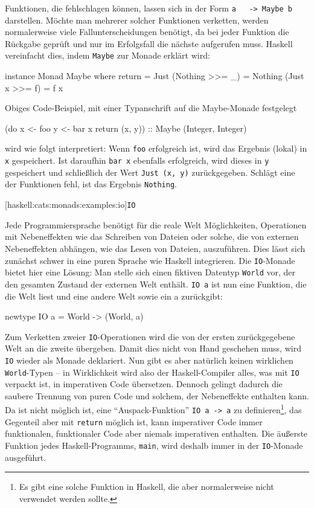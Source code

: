 \documentclass[12pt, a4paper, bibgerm]{scrbook}
\newenvironment{DIFnomarkup}{}{}
\newcommand\icode[1]{\lstinline?#1?}
\newcommand\lparagraph{}
\begin{document}
Funktionen, die fehlschlagen können, lassen sich in der Form \icode{a
  -> Maybe b} darstellen. Möchte man mehrerer solcher Funktionen
verketten, werden normalerweise viele Fallunterscheidungen benötigt, da
bei jeder Funktion die Rückgabe geprüft und nur im Erfolgsfall die
nächste aufgerufen muss. Haskell vereinfacht dies, indem \icode{Maybe}
zur Monade erklärt wird:
\begin{DIFnomarkup}\begin{code}
instance Monad Maybe
  where return = Just
        (Nothing >>= _) = Nothing
        (Just x  >>= f) = f x
\end{code}\end{DIFnomarkup} %
Obiges Code-Beispiel, mit einer Typanschrift auf die Maybe-Monade
festgelegt 
\begin{DIFnomarkup}\begin{code}
(do x <- foo
    y <- bar x
    return (x, y)) :: Maybe (Integer, Integer)
\end{code}\end{DIFnomarkup}
wird wie folgt interpretiert: Wenn \icode{foo} erfolgreich ist, wird das
Ergebnis (lokal) in \icode{x} gespeichert. Ist daraufhin \icode{bar x}
ebenfalls erfolgreich, wird dieses in \icode{y} gespeichert und
schließlich der Wert \icode{Just (x, y)} zurückgegeben. Schlägt eine der
Funktionen fehl, ist das Ergebnis \icode{Nothing}.

\lparagraph[haskell:cats:monads:examples:io]{\icode{IO}}

Jede Programmiersprache benötigt für die reale Welt Möglichkeiten,
Operationen mit Nebeneffekten wie das Schreiben von Dateien oder solche,
die von externen Nebeneffekten abhängen, wie das Lesen von Dateien,
auszuführen. Dies lässt sich zunächst schwer in eine puren Sprache wie
Haskell integrieren. Die \icode{IO}-Monade bietet hier eine Lösung: Man
stelle sich einen fiktiven Datentyp \icode{World} vor, der den gesamten
Zustand der externen Welt enthält. \icode{IO a} ist nun eine Funktion,
die die Welt liest und eine andere Welt sowie ein a zurückgibt:
\begin{DIFnomarkup}\begin{code}
newtype IO a = World -> (World, a)
\end{code}\end{DIFnomarkup}
Zum Verketten zweier \icode{IO}-Operationen wird die von der ersten
zurückgegebene Welt an die zweite übergeben. Damit dies nicht von Hand
geschehen muss, wird \icode{IO} wieder als Monade deklariert. Nun gibt
es aber natürlich keinen wirklichen \icode{World}-Typen -- in
Wirklichkeit wird also der Haskell-Compiler alles, was mit \icode{IO}
verpackt ist, in imperativen Code übersetzen. Dennoch gelingt dadurch
die saubere Trennung von puren Code und solchem, der Nebeneffekte
enthalten kann. Da ist nicht möglich ist, eine "`Auspack-Funktion"'
\icode{IO a -> a} zu definieren\footnote{Es gibt eine solche Funktion in
  Haskell, die aber normalerweise nicht verwendet werden sollte.}, das
Gegenteil aber mit \icode{return} möglich ist, kann imperativer Code
immer funktionalen, funktionaler Code aber niemals imperativen
enthalten. Die äußerste Funktion jedes Haskell-Programms, \icode{main},
wird deshalb immer in der \icode{IO}-Monade ausgeführt.
\end{document}
